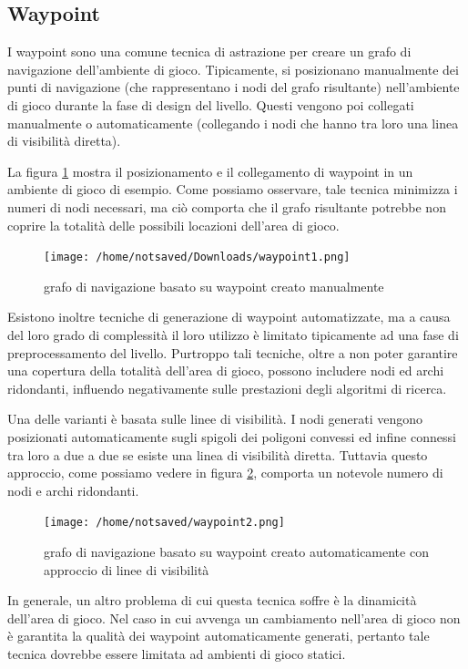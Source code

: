 \documentclass[12pt]{book}
\begin{document}
\subsection{Waypoint}
\par{I waypoint sono una comune tecnica di astrazione per creare un grafo di navigazione dell'ambiente di gioco. Tipicamente, si posizionano manualmente dei punti di navigazione (che rappresentano i nodi del grafo risultante) nell'ambiente di gioco durante la fase di design del livello. Questi vengono poi collegati manualmente o automaticamente (collegando i nodi che hanno tra loro una linea di visibilit\`a diretta).}
\par{La figura \ref{waypoint1} mostra il posizionamento e il collegamento di waypoint in un ambiente di gioco di esempio. Come possiamo osservare, tale tecnica minimizza i numeri di nodi necessari, ma ci\`o comporta che il grafo risultante potrebbe non coprire la totalit\`a delle possibili locazioni dell'area di gioco.}
\begin{figure}[htp]
\centering
\texttt{[image: /home/notsaved/Downloads/waypoint1.png]}
\caption{grafo di navigazione basato su waypoint creato manualmente}
\label{waypoint1}
\end{figure}
\par{Esistono inoltre tecniche di generazione di waypoint automatizzate, ma a causa del loro grado di complessit\`a il loro utilizzo \`e limitato tipicamente ad una fase di preprocessamento del livello. Purtroppo tali tecniche, oltre a non poter garantire una copertura della totalit\`a dell'area di gioco, possono includere nodi ed archi ridondanti, influendo negativamente sulle prestazioni degli algoritmi di ricerca.}
\par{Una delle varianti \`e basata sulle linee di visibilit\`a. I nodi generati vengono posizionati automaticamente sugli spigoli dei poligoni convessi ed infine connessi tra loro a due a due se esiste una linea di visibilit\`a diretta. Tuttavia questo approccio, come possiamo vedere in figura \ref{waypoint2}, comporta un notevole numero di nodi e archi ridondanti.}
\begin{figure}[htp]
\centering
\texttt{[image: /home/notsaved/waypoint2.png]}
\caption{grafo di navigazione basato su waypoint creato automaticamente con approccio di linee di visibilit\`a}
\label{waypoint2}
\end{figure}
\par{In generale, un altro problema di cui questa tecnica soffre \`e la dinamicit\`a dell'area di gioco. Nel caso in cui avvenga un cambiamento nell'area di gioco non \`e garantita la qualit\`a dei waypoint automaticamente generati, pertanto tale tecnica dovrebbe essere limitata ad ambienti di gioco statici.}
\end{document}
